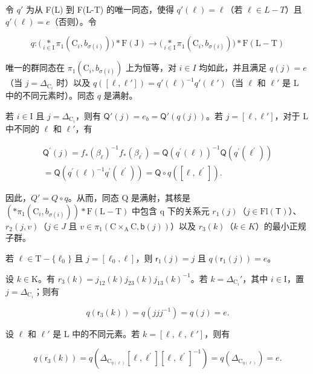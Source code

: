 令 \(q'\) 为从 F(L) 到 F(L-T) 的唯一同态，使得 \(q'(\ell) = \ell\)（若 \(\ell \in L - T\)）且 \(q'(\ell) = e\)（否则）。令

\[
q \colon \big (\underset {i \in \mathrm{I}} {\ast} \pi_ {1} (\mathrm{C} _ {i}, b _ {\sigma (i)}) \big) \ast \mathrm{F(J)} \to \big (\underset {i \in \mathrm{I}} {\ast} \pi_ {1} (\mathrm{C} _ {i}, b _ {\sigma (i)}) \big) \ast \mathrm{F(L-T)}
\]

唯一的群同态在 \(\pi_{1}(\mathrm{C}_{i},b_{\sigma(i)})\) 上为恒等，对 \(i\in I\) 均如此，并且满足 \(q(j)=e\)（当 \(j=\Delta_{\mathrm{C}_{i}}\) 时）以及 \(q([\ell,\ell'])=q'(\ell)^{-1}q'(\ell')\)（当 \(\ell\) 和 \(\ell'\) 是 L 中的不同元素时）。同态 \(q\) 是满射。

若 \(i \in \mathrm{I}\) 且 \(j = \Delta_{\mathrm{C}_i}\)，则有 \(\mathsf{Q}'(j) = e_b = \mathsf{Q}'(q(j))\)。若 \(j = [\ell, \ell']\)，对于 L 中不同的 \(\ell\) 和 \(\ell'\)，有

\[
\begin{array}{c} \mathsf {Q} ^ {\prime} (j) = f _ {*} (\beta_ {\ell}) ^ {- 1} f _ {*} (\beta_ {\ell^ {\prime}}) = \mathsf {Q} (q ^ {\prime} (\ell)) ^ {- 1} \mathsf {Q} (q ^ {\prime} (\ell^ {\prime})) \\ = \mathsf {Q} (q ^ {\prime} (\ell) ^ {- 1} q ^ {\prime} (\ell^ {\prime})) = \mathsf {Q} \circ q ([ \ell , \ell^ {\prime} ]). \end{array}
\]

因此，\(Q' = Q \circ q\)。从而，同态 Q 是满射，其核是 \(\left(\ast\pi_{1}(\mathrm{C}_{i}, b_{\sigma(i)})\right)\ast\mathrm{F}(\mathrm{L}-\mathrm{T})\) 中包含 q 下的关系元 \(r_{1}(j)\)（\(j \in \mathrm{Fl}(\mathsf{T})\)）、\(r_{2}(j, v)\)（\(j \in J\) 且 \(v \in \pi_{1}(\mathrm{C} \times_{\mathrm{A}} \mathrm{C}, \mathsf{b}(j))\)）以及 \(r_{3}(k)\)（\(k \in K\)）的最小正规子群。

若 \(\ell\in\mathrm{T}-\{\ell_{0}\}\) 且 \(j=[\ell_{0},\ell]\)，则 \(\mathsf{r}_{1}(j)=j\) 且 \(q(\mathsf{r}_{1}(j))=e\)。

设 \(k \in \mathrm{K}\)。有 \(r_3(k) = j_{12}(k)j_{23}(k)j_{13}(k)^{-1}\)。若 \(k = \Delta_{\mathrm{C}_i}'\)，其中 \(i \in \mathrm{I}\)，置 \(j = \Delta_{\mathrm{C}_i}\)；则有

\[
q (\mathsf {r} _ {3} (k)) = q (j j j ^ {- 1}) = q (j) = e.
\]

设 \(\ell\) 和 \(\ell'\) 是 L 中的不同元素。若 \(k = [\ell, \ell, \ell']\)，则有

\[
q (\mathsf {r} _ {3} (k)) = q \left(\Delta_ {\mathrm{C} _ {\eta (\ell)}} [ \ell , \ell^ {\prime} ] [ \ell , \ell^ {\prime} ] ^ {- 1}\right) = q \left(\Delta_ {\mathrm{C} _ {\eta (\ell)}}\right) = e.
\]

